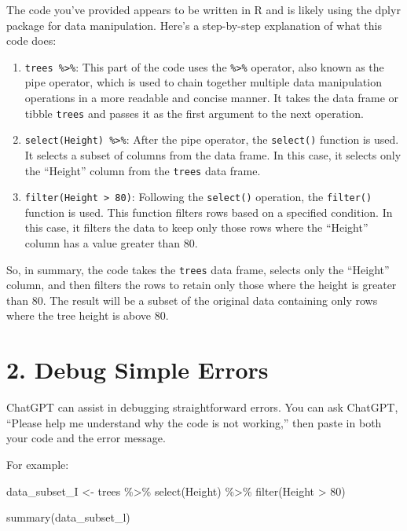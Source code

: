 \documentclass[
  letterpaper,
  DIV=11,
  numbers=noendperiod]{scrreprt}
\newenvironment{Shaded}{\begin{snugshade}}{\end{snugshade}}
\newcommand{\DecValTok}[1]{\textcolor[rgb]{0.68,0.00,0.00}{#1}}
\newcommand{\FunctionTok}[1]{\textcolor[rgb]{0.28,0.35,0.67}{#1}}
\newcommand{\NormalTok}[1]{\textcolor[rgb]{0.00,0.23,0.31}{#1}}
\newcommand{\OtherTok}[1]{\textcolor[rgb]{0.00,0.23,0.31}{#1}}
\newcommand{\SpecialCharTok}[1]{\textcolor[rgb]{0.37,0.37,0.37}{#1}}
\begin{document}
\label{chatgpt}
The code you've provided appears to be written in R and is likely using
the dplyr package for data manipulation. Here's a step-by-step
explanation of what this code does:

\begin{enumerate}
\def\labelenumi{\arabic{enumi}.}
\item
  \texttt{trees\ \%\textgreater{}\%}: This part of the code uses the
  \texttt{\%\textgreater{}\%} operator, also known as the pipe operator,
  which is used to chain together multiple data manipulation operations
  in a more readable and concise manner. It takes the data frame or
  tibble \texttt{trees} and passes it as the first argument to the next
  operation.
\item
  \texttt{select(Height)\ \%\textgreater{}\%}: After the pipe operator,
  the \texttt{select()} function is used. It selects a subset of columns
  from the data frame. In this case, it selects only the ``Height''
  column from the \texttt{trees} data frame.
\item
  \texttt{filter(Height\ \textgreater{}\ 80)}: Following the
  \texttt{select()} operation, the \texttt{filter()} function is used.
  This function filters rows based on a specified condition. In this
  case, it filters the data to keep only those rows where the ``Height''
  column has a value greater than 80.
\end{enumerate}

So, in summary, the code takes the \texttt{trees} data frame, selects
only the ``Height'' column, and then filters the rows to retain only
those where the height is greater than 80. The result will be a subset
of the original data containing only rows where the tree height is above
80.

\section{2. Debug Simple Errors}\label{debug-simple-errors}

ChatGPT can assist in debugging straightforward errors. You can ask
ChatGPT, ``Please help me understand why the code is not working,'' then
paste in both your code and the error message.

For example:

\begin{Shaded}
\begin{Highlighting}[]
\NormalTok{data\_subset\_I }\OtherTok{\textless{}{-}} 
\NormalTok{  trees }\SpecialCharTok{\%\textgreater{}\%}
  \FunctionTok{select}\NormalTok{(Height) }\SpecialCharTok{\%\textgreater{}\%} 
  \FunctionTok{filter}\NormalTok{(Height }\SpecialCharTok{\textgreater{}} \DecValTok{80}\NormalTok{)}

\FunctionTok{summary}\NormalTok{(data\_subset\_l)}
\end{Highlighting}
\end{Shaded}
\end{document}
